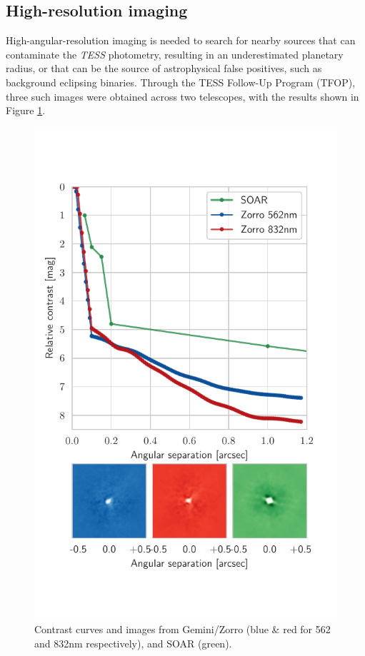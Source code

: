 \documentclass[fleqn,usenatbib]{mnras}
\newcommand{\tess}{{\it TESS}}
\begin{document}
\subsection{High-resolution imaging}
High-angular-resolution imaging is needed to search for nearby sources that can contaminate the \tess{} photometry, resulting in an underestimated planetary radius, or that can be the source of astrophysical false positives, such as background eclipsing binaries. 
Through the TESS Follow-Up Program (TFOP), three such images were obtained across two telescopes, with the results shown in Figure \ref{fig:imaging}.
\begin{figure}
    \centering
    \includegraphics[width=\columnwidth, trim={0 2cm 0.6cm 1.2cm}]{Imaging}
    \caption{Contrast curves and images from Gemini/Zorro (blue \& red for 562 and 832nm respectively), and SOAR (green).}
    \label{fig:imaging}
\end{figure}
\end{document}
